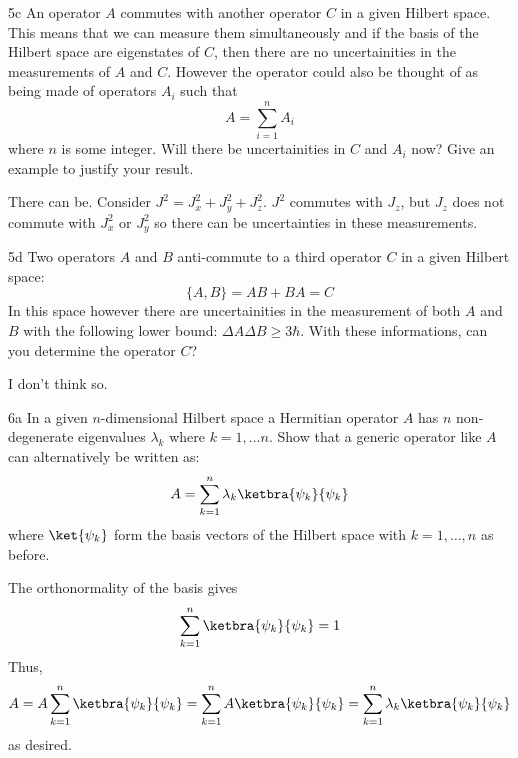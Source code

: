 \documentclass[12pt]{article}
\begin{document}
\begin{exc}{5c}
An operator $A$ commutes with another operator $C$ in a given Hilbert
space. This means that we can measure them simultaneously and if
the basis of the Hilbert space are eigenstates of $C$, then there are no
uncertainities in the measurements of $A$ and $C$. However the operator
could also be thought of as being made of operators $A_i$ such that
\begin{equation}
    A = \sum_{i = 1}^n A_i
\end{equation}
where $n$ is some integer. Will there be uncertainities in $C$ and $A_i$ now?
Give an example to justify your result.
\end{exc}
\begin{ans}
    There can be. Consider $J^2 = J_x^2 + J_y^2 + J_z^2$. $J^2$ commutes with $J_z$, but $J_z$ does not commute with $J_x^2$ or $J_y^2$ so there can be uncertainties in these measurements.
\end{ans}

\begin{exc}{5d}
Two operators $A$ and $B$ anti-commute to a third operator $C$ in a given
Hilbert space:
\begin{equation}
    \{A, B\} = AB + BA = C
\end{equation}
In this space however there are uncertainities in the measurement of
both $A$ and $B$ with the following lower bound: $\Delta A \Delta B \geq 3\hbar$. With
these informations, can you determine the operator $C$?
\end{exc}
\begin{ans}
I don't think so.
\end{ans}

\newpage 
\begin{exc}{6a}
In a given $n$-dimensional Hilbert space a Hermitian operator $A$ has $n$
non-degenerate eigenvalues $\lambda_k$ where $k = 1,\ldots n$. Show that a generic
operator like $A$ can alternatively be written as:
\[A = \sum_{k = 1}^n \lambda_k \ketbra{\psi_k}{\psi_k}\]
where $\ket{\psi_k}$ form the basis vectors of the Hilbert space with $k = 1,\ldots, n$ as before.
\end{exc}
\begin{ans}
    The orthonormality of the basis gives 
    \[\sum_{k = 1}^n \ketbra{\psi_k}{\psi_k} = 1\]
    Thus, 
    \[A = A\sum_{k = 1}^n \ketbra{\psi_k}{\psi_k} = \sum_{k = 1}^n A\ketbra{\psi_k}{\psi_k} = \sum_{k = 1}^n \lambda_k\ketbra{\psi_k}{\psi_k}\]
    as desired.
\end{ans}
\end{document}
